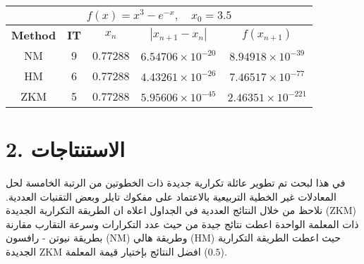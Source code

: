 \vspace{1cm}
\begin{table}[H]
	\caption{}
	\renewcommand{\arraystretch}{1.5}
	\centering
	\begin{english}
		\begin{tabular}{|c|c|c|c|c|}
			\hline
			\multicolumn{5}{|c|}{$f(x) = x^3 - e^{-x}, \quad x_0 = 3.5$}\\
			\hline
			\textbf{Method} & \textbf{IT} & $x_n$ & $|x_{n+1}-x_n|$& $f(x_{n+1})$ \\
			\hline
			NM & 9 & 0.77288 & $6.54706\times 10^{-20}$ & $8.94918\times 10^{-39}$\\
			HM & 6 & 0.77288 & $4.43261\times 10^{-26}$ & $7.46517\times 10^{-77}$\\
			ZKM & 5 & 0.77288 & $5.95606\times10^{-45}$ & $2.46351 \times10^{-221}$\\
			\hline
		\end{tabular}
	\end{english}
\end{table}

\section*{2. الاستنتاجات}
في هذا لبحث تم تطوير عائلة تكرارية جديدة ذات الخطوتين من الرتبة الخامسة لحل المعادلات غير الخطية التربيعية بالاعتماد على مفكوك تايلر وبعض التقنيات العددية. نلاحظ من خلال النتائج العددية في الجداول اعلاه ان الطريقة التكرارية الجديدة (ZKM) ذات المعلمة الواحدة اعطت نتائج جيدة من حيث عدد التكرارات وسرعة التقارب مقارنة بطريقة نيوتن - رافسون (NM) وطريقة هالي (HM) حيث اعطت الطريقة التكرارية الجديدة ZKM افضل النتائج بإختيار قيمة المعلمة ($0.5$).


